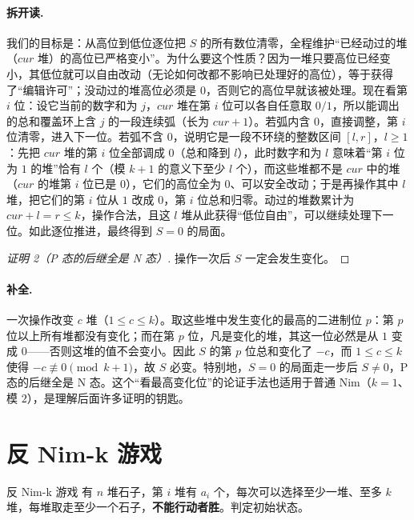 \documentclass[UTF8,a4paper,11pt,oneside,openany,fontset=fandol]{ctexbook}
\theoremstyle{definition}
\begin{document}
\paragraph{拆开读.} 我们的目标是：从高位到低位逐位把 $S$ 的所有数位清零，全程维护“已经动过的堆（$cur$ 堆）的高位已严格变小”。为什么要这个性质？因为一堆只要高位已经变小，其低位就可以自由改动（无论如何改都不影响已处理好的高位），等于获得了“编辑许可”；没动过的堆高位必须是 $0$，否则它的高位早就该被处理。现在看第 $i$ 位：设它当前的数字和为 $j$，$cur$ 堆在第 $i$ 位可以各自任意取 $0/1$，所以能调出的总和覆盖环上含 $j$ 的一段连续弧（长为 $cur+1$）。若弧内含 $0$，直接调整，第 $i$ 位清零，进入下一位。若弧不含 $0$，说明它是一段不环绕的整数区间 $[l,r]$，$l\ge1$：先把 $cur$ 堆的第 $i$ 位全部调成 $0$（总和降到 $l$），此时数字和为 $l$ 意味着“第 $i$ 位为 $1$ 的堆”恰有 $l$ 个（模 $k+1$ 的意义下至少 $l$ 个），而这些堆都不是 $cur$ 中的堆（$cur$ 的堆第 $i$ 位已是 $0$），它们的高位全为 $0$、可以安全改动；于是再操作其中 $l$ 堆，把它们的第 $i$ 位从 $1$ 改成 $0$，第 $i$ 位总和归零。动过的堆数累计为 $cur+l=r\le k$，操作合法，且这 $l$ 堆从此获得“低位自由”，可以继续处理下一位。如此逐位推进，最终得到 $S=0$ 的局面。

\begin{proof}[证明 2（P 态的后继全是 N 态）]
操作一次后 $S$ 一定会发生变化。
\end{proof}
\paragraph{补全.} 一次操作改变 $c$ 堆（$1\le c\le k$）。取这些堆中发生变化的最高的二进制位 $p$：第 $p$ 位以上所有堆都没有变化；而在第 $p$ 位，凡是变化的堆，其这一位必然是从 $1$ 变成 $0$——否则这堆的值不会变小。因此 $S$ 的第 $p$ 位总和变化了 $-c$，而 $1\le c\le k$ 使得 $-c\not\equiv0\pmod{k+1}$，故 $S$ 必变。特别地，$S=0$ 的局面走一步后 $S\ne0$，P 态的后继全是 N 态。这个“看最高变化位”的论证手法也适用于普通 Nim（$k=1$、模 $2$），是理解后面许多证明的钥匙。

\section{反 Nim-k 游戏}
\begin{problem}{反 Nim-k 游戏}
有 $n$ 堆石子，第 $i$ 堆有 $a_i$ 个，每次可以选择至少一堆、至多 $k$ 堆，每堆取走至少一个石子，\textbf{不能行动者胜}。判定初始状态。
\end{problem}
\end{document}
